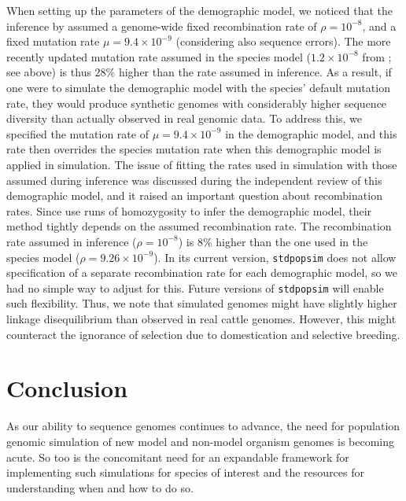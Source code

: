 \documentclass[hidelinks]{article}
\newcommand{\stdpopsim}{\texttt{stdpopsim}\xspace}
\begin{document}
When setting up the parameters of the demographic model, we noticed that the inference by \cite{MacLeod2013} assumed a genome-wide fixed recombination rate of \(\rho=10^{-8}\), and a fixed mutation rate \(\mu=9.4 \times 10^{-9}\) (considering also sequence errors).
%
The more recently updated mutation rate assumed in the species model (\(1.2\times 10^{-8}\) from  \citep{Harland2017}; see above) is thus \(28\%\) higher than the rate assumed in inference.
%
As a result, if one were to simulate the demographic model with the species' default mutation rate, they would produce synthetic genomes with considerably higher sequence diversity than actually observed in real genomic data.
%
To address this, we specified the mutation rate of \(\mu=9.4 \times 10^{-9}\) in the demographic model, and this rate then overrides the species mutation rate when this demographic model is applied in simulation.
%
%
The issue of fitting the rates used in simulation with those assumed during inference was discussed during the independent review of this demographic model, and it raised an important question about recombination rates. Since \cite{MacLeod2013} use runs of homozygosity to infer the demographic model, their method tightly depends on the assumed recombination rate. The recombination rate assumed in inference (\(\rho=10^{-8}\)) is \(8\%\) higher than the one used in the species model (\(\rho=9.26\times 10^{-9}\)). In its current version, \stdpopsim does not allow specification of a separate recombination rate for each demographic model, so we had no simple way to adjust for this. Future versions of \stdpopsim will enable such flexibility. Thus, we note that simulated genomes might have slightly higher linkage disequilibrium than observed in real cattle genomes. However, this might counteract the ignorance of selection due to domestication and selective breeding.

\hypertarget{conclusion}{%
\section*{Conclusion}\label{conclusion}}

As our ability to sequence genomes continues to advance, the need for
population genomic simulation of new model and non-model organism genomes is
becoming acute. So too is the concomitant need for an expandable framework
for implementing such simulations for species of interest and
the resources for understanding when and how to do so.
\end{document}
